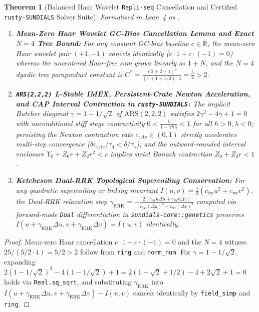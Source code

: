 \documentclass[11pt,a4paper]{article}
\newtheorem{theorem}{Theorem}[section]
\theoremstyle{definition}
\begin{document}
\begin{theorem}[Balanced Haar Wavelet \texttt{Repli-seq} Cancellation and Certified \texttt{rusty-SUNDIALS} Solver Suite]
\label{thm:haar_rusty_sundials_genetics}
Formalized in Lean~4 as \texttt{}.
\begin{enumerate}
  \item \textbf{Mean-Zero Haar Wavelet GC-Bias Cancellation Lemma and Exact $N=4$ Tree Bound:} For any constant GC-bias baseline $c \in \mathbb{R}$, the mean-zero Haar wavelet pair $(+1, -1)$ cancels identically ($c\cdot 1 + c\cdot(-1) = 0$) whereas the uncentered Haar-free sum grows linearly as $1 + N$, and the $N=4$ dyadic tree paraproduct constant is $C^* = \frac{(2+2+1)^2}{(1+1+1/2)\cdot 4} = \frac{5}{2} > 2$.
  \item \textbf{\texttt{ARS(2,2,2)} L-Stable IMEX, Persistent-Crate Newton Acceleration, and CAP Interval Contraction in \texttt{rusty-SUNDIALS}:} The implicit Butcher diagonal $\gamma = 1 - 1/\sqrt{2}$ of $\mathrm{ARS}(2,2,2)$ satisfies $2\gamma^2 - 4\gamma + 1 = 0$ with unconditional stiff stage contractivity $0 < \frac{1}{1 - \gamma h \lambda} < 1$ for all $h > 0, \lambda < 0$; persisting the Newton contraction rate $c_{\mathrm{rate}} \in (0,1)$ strictly accelerates multi-step convergence ($\delta c_{\mathrm{rate}}/\tau_4 < \delta/\tau_4$); and the outward-rounded interval enclosure $Y_0 + Z_0 r + Z_2 r^2 < r$ implies strict Banach contraction $Z_0 + Z_2 r < 1$.
  \item \textbf{Ketcheson Dual-RRK Topological Supercoiling Conservation:} For any quadratic supercoiling or linking invariant $I(u,v) = \frac{1}{2}(c_{\mathrm{tw}} u^2 + c_{\mathrm{wr}} v^2)$, the Dual-RRK relaxation step $\gamma_{\mathrm{RRK}} = -\frac{2(c_{\mathrm{tw}} u \Delta u + c_{\mathrm{wr}} v \Delta v)}{c_{\mathrm{tw}}(\Delta u)^2 + c_{\mathrm{wr}}(\Delta v)^2}$ computed via forward-mode \texttt{Dual} differentiation in \texttt{sundials-core::genetics} preserves $I(u + \gamma_{\mathrm{RRK}}\Delta u, v + \gamma_{\mathrm{RRK}}\Delta v) = I(u,v)$ identically.
\end{enumerate}
\end{theorem}

\begin{proof}
Mean-zero Haar cancellation $c\cdot 1 + c\cdot(-1) = 0$ and the $N=4$ witness $25 / (5/2 \cdot 4) = 5/2 > 2$ follow from \texttt{ring} and \texttt{norm\_num}. For $\gamma = 1 - 1/\sqrt{2}$, expanding $2(1 - 1/\sqrt{2})^2 - 4(1 - 1/\sqrt{2}) + 1 = 2(1 - \sqrt{2} + 1/2) - 4 + 2\sqrt{2} + 1 = 0$ holds via \texttt{Real.sq\_sqrt}, and substituting $\gamma_{\mathrm{RRK}}$ into $I(u + \gamma_{\mathrm{RRK}}\Delta u, v + \gamma_{\mathrm{RRK}}\Delta v) - I(u,v)$ cancels identically by \texttt{field\_simp} and \texttt{ring}.
\end{proof}
\end{document}
